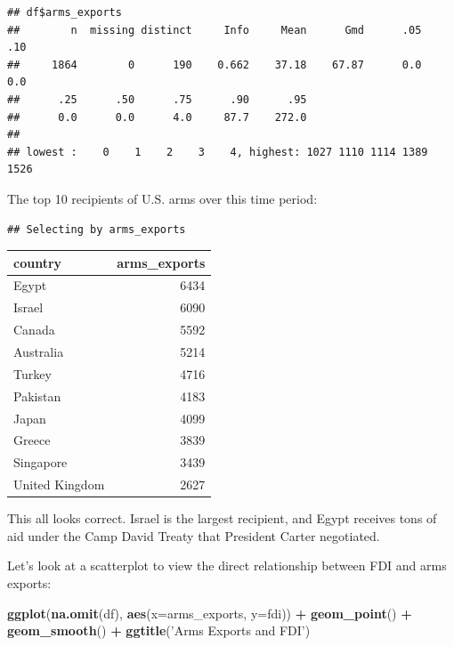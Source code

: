 \documentclass[12pt,]{article}
\newenvironment{Shaded}{\begin{snugshade}}{\end{snugshade}}
\newcommand{\DataTypeTok}[1]{\textcolor[rgb]{0.13,0.29,0.53}{#1}}
\newcommand{\DecValTok}[1]{\textcolor[rgb]{0.00,0.00,0.81}{#1}}
\newcommand{\KeywordTok}[1]{\textcolor[rgb]{0.13,0.29,0.53}{\textbf{#1}}}
\newcommand{\NormalTok}[1]{#1}
\newcommand{\OperatorTok}[1]{\textcolor[rgb]{0.81,0.36,0.00}{\textbf{#1}}}
\newcommand{\StringTok}[1]{\textcolor[rgb]{0.31,0.60,0.02}{#1}}
\begin{document}
\begin{verbatim}
## df$arms_exports 
##        n  missing distinct     Info     Mean      Gmd      .05      .10 
##     1864        0      190    0.662    37.18    67.87      0.0      0.0 
##      .25      .50      .75      .90      .95 
##      0.0      0.0      4.0     87.7    272.0 
## 
## lowest :    0    1    2    3    4, highest: 1027 1110 1114 1389 1526
\end{verbatim}

The top 10 recipients of U.S. arms over this time period:

\begin{Shaded}
\end{Shaded}

\begin{verbatim}
## Selecting by arms_exports
\end{verbatim}

\begin{longtable}[]{@{}lr@{}}
\toprule
country & arms\_exports\tabularnewline
\midrule
\endhead
Egypt & 6434\tabularnewline
Israel & 6090\tabularnewline
Canada & 5592\tabularnewline
Australia & 5214\tabularnewline
Turkey & 4716\tabularnewline
Pakistan & 4183\tabularnewline
Japan & 4099\tabularnewline
Greece & 3839\tabularnewline
Singapore & 3439\tabularnewline
United Kingdom & 2627\tabularnewline
\bottomrule
\end{longtable}

This all looks correct. Israel is the largest recipient, and Egypt
receives tons of aid under the Camp David Treaty that President Carter
negotiated.

Let's look at a scatterplot to view the direct relationship between FDI
and arms exports:

\begin{Shaded}
\begin{Highlighting}[]
\KeywordTok{ggplot}\NormalTok{(}\KeywordTok{na.omit}\NormalTok{(df), }\KeywordTok{aes}\NormalTok{(}\DataTypeTok{x=}\NormalTok{arms_exports, }\DataTypeTok{y=}\NormalTok{fdi)) }\OperatorTok{+}\StringTok{ }
\StringTok{    }\KeywordTok{geom_point}\NormalTok{() }\OperatorTok{+}
\StringTok{    }\KeywordTok{geom_smooth}\NormalTok{() }\OperatorTok{+}
\StringTok{    }\KeywordTok{ggtitle}\NormalTok{(}\StringTok{'Arms Exports and FDI'}\NormalTok{)}
\end{Highlighting}
\end{Shaded}
\end{document}
